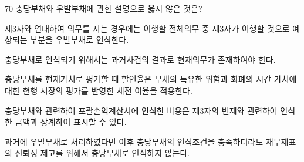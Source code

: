 \begin{question}{70}
충당부채와 우발부채에 관한 설명으로 옳지 않은 것은?
\begin{choices}
  \item 제3자와 연대하여 의무를 지는 경우에는 이행할 전체의무 중 제3자가 이행할 것으로 예상되는 부분을 우발부채로 인식한다.
  \item 충당부채로 인식되기 위해서는 과거사건의 결과로 현재의무가 존재하여야 한다.
  \item 충당부채를 현재가치로 평가할 때 할인율은 부채의 특유한 위험과 화폐의 시간 가치에 대한 현행 시장의 평가를 반영한 세전 이율을 적용한다.
  \item 충당부채와 관련하여 포괄손익계산서에 인식한 비용은 제3자의 변제와 관련하여 인식한 금액과 상계하여 표시할 수 있다.
  \item 과거에 우발부채로 처리하였다면 이후 충당부채의 인식조건을 충족하더라도 재무제표의 신뢰성 제고를 위해서 충당부채로 인식하지 않는다.
\end{choices}
\end{question}
